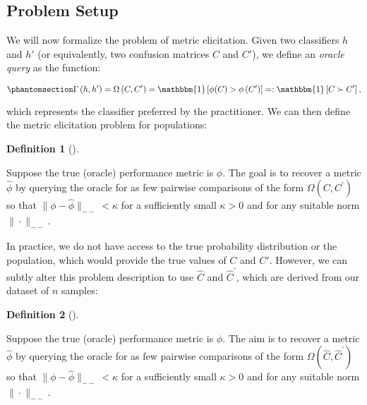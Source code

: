 \documentclass[
  letterpaper,
  numbers=noenddot,
  DIV=11]{scrreprt}
\theoremstyle{definition}
\newtheorem{definition}{Definition}[chapter]
\theoremstyle{plain}
\theoremstyle{plain}
\theoremstyle{remark}
\begin{document}
\subsection{Problem Setup}\label{sec-metric-elicitation-setup}

We will now formalize the problem of metric elicitation. Given two
classifiers \(h\) and \(h'\) (or equivalently, two confusion matrices
\(C\) and \(C'\)), we define an \emph{oracle query} as the function:

\begin{equation}\phantomsection\label{eq-oracle}{\Gamma\left(h, h^{\prime}\right)=\Omega\left(C, C^{\prime}\right)=\mathbbm{1}\left[\phi(C)>\phi\left(C^{\prime}\right)\right]=: \mathbbm{1} \left[C \succ C^{\prime}\right],}\end{equation}

which represents the classifier preferred by the practitioner. We can
then define the metric elicitation problem for populations:

\begin{tcolorbox}[colframe=.grey, title=\faPenSquare \enspace Definition]

\begin{definition}[]\protect\hypertarget{def-def3.1}{}\label{def-def3.1}

Suppose the true (oracle) performance metric is \(\phi\). The goal is to
recover a metric \(\hat{\phi}\) by querying the oracle for as few
pairwise comparisons of the form \(\Omega\left(C, C^{\prime}\right)\) so
that \(\|\phi - \hat{\phi}\|_{--} < \kappa\) for a sufficiently small
\(\kappa > 0\) and for any suitable norm \(\|\cdot\|_{--}\).

\end{definition}

\end{tcolorbox}

In practice, we do not have access to the true probability distribution
or the population, which would provide the true values of \(C\) and
\(C'\). However, we can subtly alter this problem description to use
\(\hat{C}\) and \(\hat{C}^{\prime}\), which are derived from our dataset
of \(n\) samples:

\begin{tcolorbox}[colframe=.grey, title=\faPenSquare \enspace Definition]

\begin{definition}[]\protect\hypertarget{def-def3.2}{}\label{def-def3.2}

Suppose the true (oracle) performance metric is \(\phi\). The aim is to
recover a metric \(\hat{\phi}\) by querying the oracle for as few
pairwise comparisons of the form
\(\Omega\left(\hat{C}, \hat{C}^{\prime}\right)\) so that
\(\|\phi - \hat{\phi}\|_{--} < \kappa\) for a sufficiently small
\(\kappa > 0\) and for any suitable norm \(\|\cdot\|_{--}\).

\end{definition}

\end{tcolorbox}
\end{document}

